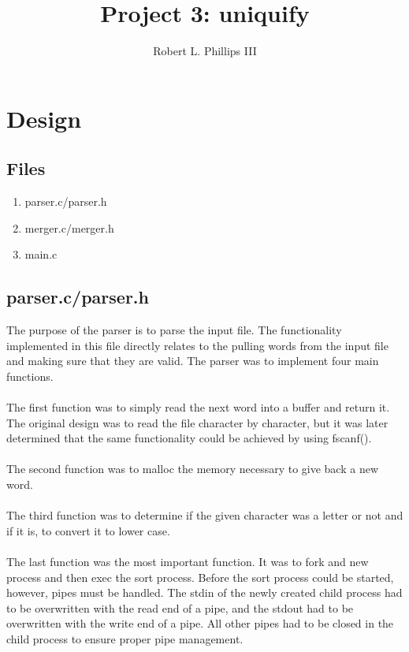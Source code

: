 \documentclass{article}
\begin{document}
\title{Project 3:  uniquify}
\author{Robert L. Phillips III}
\maketitle
\newpage
\tableofcontents
\newpage

\section{Design}
\subsection{Files}
\begin{enumerate}
\item parser.c/parser.h
\item merger.c/merger.h
\item main.c
\end{enumerate}

\subsection{parser.c/parser.h}
The purpose of the parser is to parse the input file.  The functionality implemented in this file directly relates to the pulling words from the input file and making sure that they are valid.  The parser was to implement four main functions.  
\\\\The first function was to simply read the next word into a buffer and return it.  The original design was to read the file character by character, but it was later determined that the same functionality could be achieved by using fscanf().  
\\\\The second function was to malloc the memory necessary to give back a new word.  
\\\\The third function was to determine if the given character was a letter or not and if it is, to convert it to lower case.
\\\\The last function was the most important function.  It was to fork and new process and then exec the sort process.  Before the sort process could be started, however, pipes must be handled.  The stdin of the newly created child process had to be overwritten with the read end of a pipe, and the stdout had to be overwritten with the write end of a pipe.  All other pipes had to be closed in the child process to ensure proper pipe management.
\end{document}
